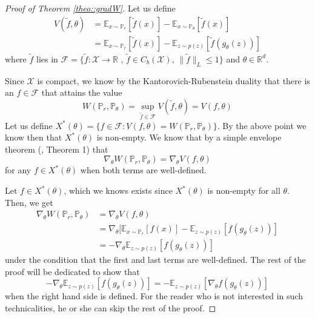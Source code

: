 \documentclass{article} %
\newcommand\EE{\mathbb{E}}
\newcommand\PP{\mathbb{P}}
\newcommand\RR{\mathbb{R}}
\theoremstyle{definition}
\theoremstyle{definition}
\newcommand\manX{\mathcal{X}}
\newcommand\manF{\mathcal{F}}
\begin{document}
\begin{appendices}
\begin{proof}[Proof of Theorem \autoref{theo::gradW}]
  Let us define
  \begin{align*}
    V(\tilde f, \theta) &= \EE_{x \sim \PP_r}[\tilde f(x)] - \EE_{x \sim \PP_\theta} [\tilde f(x)] \\
    &= \EE_{x \sim \PP_r}[\tilde f(x)] - \EE_{z \sim p(z)} [\tilde f(g_\theta(z))]
  \end{align*}
  where $\tilde f$ lies in $\manF = \{\tilde f: \manX \to \RR \text{ , $\tilde f \in C_b(\manX)$, $\|\tilde f\|_L \leq 1$}\}$ and
  $\theta \in \RR^d$.
  
  Since $\manX$ is compact, we know 
  by the Kantorovich-Rubenstein duality \cite{Vil} that
  there is an $f \in \manF$ that attains the value
  \begin{equation*}
    W(\PP_r, \PP_\theta) = \sup_{\tilde f \in \manF} V(\tilde f, \theta) = V(f, \theta)
  \end{equation*}
  Let us define $X^*(\theta) = \{f \in \manF: V(f, \theta) = W(\PP_r, \PP_\theta)\}$. By
  the above point we know then that $X^*(\theta)$ is non-empty. We know
  that by a simple envelope theorem (\cite{Milgrom-ea-envelope}, Theorem 1) that
  $$ \nabla_\theta W(\PP_r, \PP_\theta) = \nabla_\theta V(f, \theta) $$
  for any $f \in X^*(\theta)$ when both terms are well-defined.
  
  Let $f \in X^*(\theta)$, which we knows exists
  since $X^*(\theta)$ is non-empty for all $\theta$. Then, we get 
  \begin{align*}
    \nabla_\theta W(\PP_r, \PP_\theta) &= \nabla_\theta V(f, \theta) \\
    &= \nabla_\theta[ \EE_{x \sim \PP_r}[f(x)] - \EE_{z \sim p(z)}[f(g_\theta(z))] \\
      &= -\nabla_\theta \EE_{z \sim p(z)}[f(g_\theta(z))]
  \end{align*}
  under the condition that the first and last terms are well-defined.
  The rest of the proof will be dedicated to show that
  \begin{equation} \label{eq::difsign}
    -\nabla_\theta \EE_{z \sim p(z)}[f(g_\theta(z))] = -\EE_{z \sim p(z)}[\nabla_\theta f(g_\theta(z))]
  \end{equation}
  when the right hand side is defined. For the reader who is
  not interested in such technicalities, he or she can skip the
  rest of the proof.
  

\end{proof}
\end{appendices}
\end{document}
